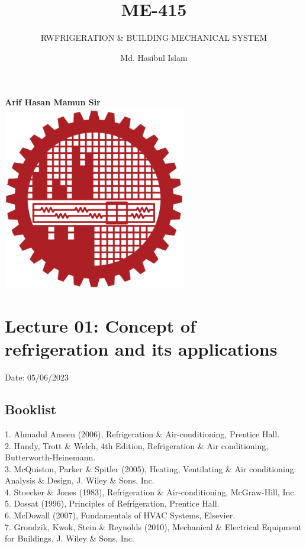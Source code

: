 \documentclass{article}
\title{ME-415}
\author{Md. Hasibul Islam}
\subtitle{RWFRIGERATION \& BUILDING MECHANICAL SYSTEM}
\begin{document}
\begin{titlepage}
    \centering
    
    {\Huge\bfseries\maketitle}
    \textbf{Arif Hasan Mamun Sir} \\
    \vspace{2cm}
    \includegraphics[width=8cm]{institution_logo.jpg}
    \vfill
    \vspace*{2cm}
\end{titlepage}

\tableofcontents
\pagebreak
\section{Lecture 01: Concept of refrigeration and its applications} 
\hfill Date: 05/06/2023

\subsection*{Booklist}
1. Ahmadul Ameen (2006), Refrigeration \& Air-conditioning, 
Prentice Hall.\\
2. Hundy, Trott \& Welch, 4th Edition, Refrigeration \& Air conditioning, Butterworth-Heinemann.\\
3. McQuiston, Parker \& Spitler (2005), Heating, Ventilating \& Air conditioning: Analysis \& Design, J. Wiley \& Sons, Inc.\\
4. Stoecker \& Jones (1983), Refrigeration \& Air-conditioning, 
McGraw-Hill, Inc.\\
5. Dossat (1996), Principles of Refrigeration, Prentice Hall.\\
6. McDowall (2007), Fundamentals of HVAC Systems, Elsevier.\\
7. Grondzik, Kwok, Stein \& Reynolds (2010), Mechanical \& 
Electrical Equipment for Buildings, J. Wiley \& Sons, Inc.\\
\end{document}
